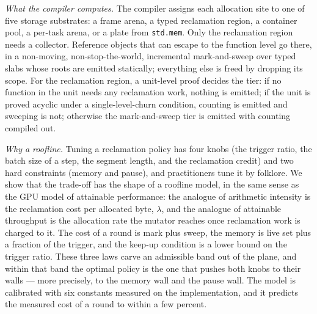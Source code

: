 \noindent\emph{What the compiler computes.}
The compiler assigns each allocation site to one of five storage substrates: a frame arena, a typed reclamation region,
a container pool, a per-task arena, or a plate from \texttt{std.mem}.
Only the reclamation region needs a collector.
Reference objects that can escape to the function level go there, in a non-moving, non-stop-the-world, incremental
mark-and-sweep over typed slabs whose roots are emitted statically; everything else is freed by dropping its scope.
For the reclamation region, a unit-level proof decides the tier: if no function in the unit needs any reclamation work,
nothing is emitted; if the unit is proved acyclic under a single-level-churn condition, counting is emitted and sweeping is
not; otherwise the mark-and-sweep tier is emitted with counting compiled out.

\noindent\emph{Why a roofline.}
Tuning a reclamation policy has four knobs (the trigger ratio, the batch size of a step, the segment length, and the
reclamation credit) and two hard constraints (memory and pause), and practitioners tune it by folklore.
We show that the trade-off has the shape of a roofline model, in the same sense as the GPU model of attainable
performance: the analogue of arithmetic intensity is the reclamation cost per allocated byte, $\lambda$, and the analogue of
attainable throughput is the allocation rate the mutator reaches once reclamation work is charged to it.
The cost of a round is mark plus sweep, the memory is live set plus a fraction of the trigger, and the keep-up condition
is a lower bound on the trigger ratio. These three laws carve an admissible band out of the plane, and within that band the
optimal policy is the one that pushes both knobs to their walls --- more precisely, to the memory wall and the pause wall.
The model is calibrated with six constants measured on the implementation, and it predicts the measured cost of a round to
within a few percent.


